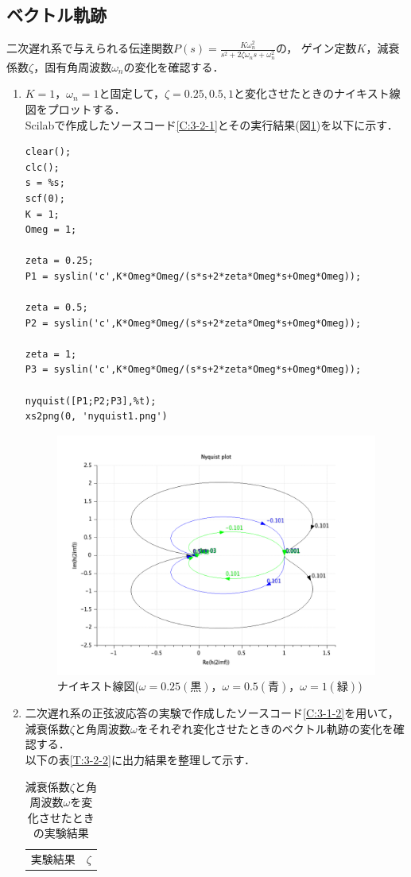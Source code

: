 \documentclass[a4paper,11pt]{jsarticle}
\begin{document}
\subsection{ベクトル軌跡}
二次遅れ系で与えられる伝達関数$P(s) = \frac{K\omega^2_n}{s^2+2\zeta\omega_ns+\omega^2_n}$の，
ゲイン定数$K$，減衰係数$\zeta$，固有角周波数$\omega_n$の変化を確認する．
\begin{enumerate}
  \item $K=1$，$\omega_n = 1$と固定して，$\zeta = 0.25, 0.5, 1$と変化させたときのナイキスト線図をプロットする．\\

        Scilabで作成したソースコード\ref{C:3-2-1}とその実行結果(図\ref{3-2-1})を以下に示す．
        \begin{lstlisting}[caption=二次遅れ系のナイキスト線図, label=C:3-2-1]
clear();
clc();
s = %s;
scf(0);
K = 1;
Omeg = 1;

zeta = 0.25;
P1 = syslin('c',K*Omeg*Omeg/(s*s+2*zeta*Omeg*s+Omeg*Omeg));

zeta = 0.5;
P2 = syslin('c',K*Omeg*Omeg/(s*s+2*zeta*Omeg*s+Omeg*Omeg));

zeta = 1;
P3 = syslin('c',K*Omeg*Omeg/(s*s+2*zeta*Omeg*s+Omeg*Omeg));

nyquist([P1;P2;P3],%t);
xs2png(0, 'nyquist1.png')
      \end{lstlisting}
        \begin{figure}[H]
          \centering
          \includegraphics[width=0.8\linewidth]{picture/3-2-1.png}
          \caption{ナイキスト線図($\omega=0.25(黒)$，$\omega = 0.5(青)$，$\omega = 1(緑)$)}
          \label{3-2-1}
        \end{figure}

  \item 二次遅れ系の正弦波応答の実験で作成したソースコード\ref{C:3-1-2}を用いて，
        減衰係数$\zeta$と角周波数$\omega$をそれぞれ変化させたときのベクトル軌跡の変化を確認する．\\
        以下の表\ref{T:3-2-2}に出力結果を整理して示す．
        \newpage
        \begin{table}[H]
          \centering
          \caption{減衰係数$\zeta$と角周波数$\omega$を変化させたときの実験結果}
          \begin{tabular}{|c|c|c|c|c|} \hline
            \multicolumn{2}{|c|}{\multirow{2}{*}{実験結果}}
             &
            \multicolumn{3}{|c|}{$\zeta$}
            \\ \cline{3-5}



\end{tabular}
\end{table}
\end{enumerate}
\end{document}
